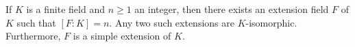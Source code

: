 If $K$ is a finite field and $n \geq 1$ an integer, then there exists an extension field $F$ of $K$ such that $[F : K] = n$. Any two such extensions are $K$-isomorphic. Furthermore, $F$ is a simple extension of $K$.
